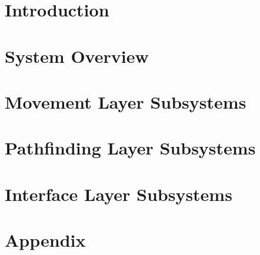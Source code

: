 \documentclass[11pt,letterpaper]{article}
\begin{document}
\setcounter{tocdepth}{2}
\tableofcontents
\newpage

\listoffigures
\newpage


\section{Introduction}

\newpage

\section{System Overview}

\newpage
%
\newpage
\section{Movement Layer Subsystems}

\newpage
\section{Pathfinding Layer Subsystems}

\newpage
\section{Interface Layer Subsystems}

\clearpage
\section{Appendix}

\clearpage

% 

{}
\end{document}
